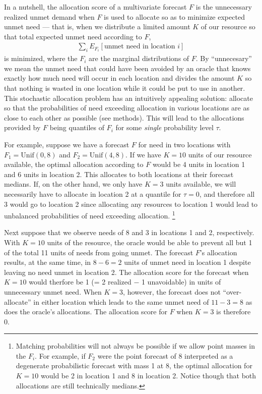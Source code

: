 \documentclass{article}
\begin{document}
In a nutshell, the allocation score of a multivariate forecast $F$ is the unnecessary realized unmet demand when $F$ is used to allocate so as to minimize expected unmet 
need --- that is, when we distribute a limited amount $K$ of our resource so that total expected unmet need according to $F$,
\begin{align}
\sum_i E_{F_i}[\text{unmet need in location $i$}]
\end{align}
is minimized, where the $F_i$ are the marginal distributions of $F$. By ``unnecesary'' we mean the unmet need that could have been avoided by an oracle that knows exactly how much need will occur in each location and divides the amount $K$ so that nothing is wasted in one location while it could be put to use in another.
This stochastic allocation problem has an intuitively appealing solution: allocate so that the probabilities of need exceeding allocation 
in various locations are as close to each other as possible (see methods).  This will lead to the allocations provided by $F$ being quantiles of $F_i$ for some \emph{single} probability level $\tau$.

For example, suppose we have a forecast $F$ for need in two locations with $F_1 = \mathrm{Unif}(0,8)$ and $F_2 = \mathrm{Unif}(4,8)$. If we have $K = 10$ units
of our resource available, the optimal allocation according to $F$ would be 4 units in location 1 and 6 units in location 2. This allocates to both locations at their forecast medians.  If, on the other hand, we only have $K = 3$ units available, we will necessarily have to allocate in location 2 at a quantile for $\tau = 0$, and therefore all 3 would go to location 2 since allocating any resources to location 1 would lead to unbalanced probabilities of need exceeding allocation. 
\footnote{Matching probabilities will not always be possible if we allow point masses in the $F_i$.  For example, if $F_2$ were the point forecast of 8 interpreted as a degenerate probabilistic forecast with mass 1 at 8, the optimal allocation for $K = 10$ would be 2 in location 1 and 8 in location 2. Notice though that both allocations are still technically medians.}

Next suppose that we observe needs of 8 and 3 in locations 1 and 2, respectively. With $K = 10$ units of the resource, the oracle would be able to prevent all
but 1 of the total 11 units of needs from going unmet. The forecast $F$'s allocation results, at the same time, in $8 - 6 = 2$ units of unmet need in location 1 despite leaving no need unmet in location 2. The allocation score for the forecast when $K = 10$ would therfore be
1 (= 2 realized $-$  1 unavoidable) in units of unnecessary unmet need.  When $K = 3$, however, the forecast does not ``over-allocate'' in either location which leads to the same unmet need of $11 - 3 = 8$ as does the oracle's allocations.  The allocation score for $F$ when $K = 3$ is therefore 0.
\end{document}
